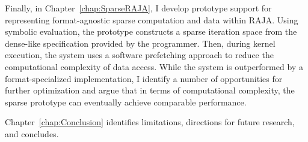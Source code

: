 Finally, in Chapter~\ref{chap:SparseRAJA}, I develop prototype support for representing format-agnostic sparse computation and data within RAJA.
Using symbolic evaluation, the prototype constructs a sparse iteration space from the dense-like specification provided by the programmer.
Then, during kernel execution, the system uses a software prefetching approach to reduce the computational complexity of data access.
While the system is outperformed by a format-specialized implementation, I identify a number of opportunities for further optimization and argue that in terms of computational complexity, the sparse prototype can eventually achieve comparable performance.

Chapter~\ref{chap:Conclusion} identifies limitations, directions for future research, and concludes.
